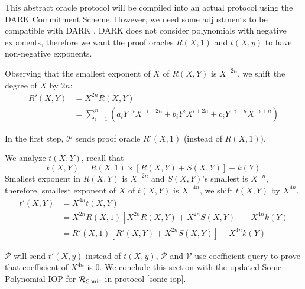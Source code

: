 This abstract oracle protocol will be compiled into an actual protocol using the DARK Commitment Scheme. However, we need some adjustments to be compatible with DARK \cite{bunz2020transparent}. DARK does not consider polynomials with negative exponents, therefore we want the proof oracles $R(X, 1)$ and $t(X, y)$ to have non-negative exponents.

Observing that the smallest exponent of $X$ of $R(X, Y)$ is $X^{-2n}$, we shift the degree of $X$ by $2n$:
\begin{align*}
R'(X, Y)
&= X^{2n} R(X, Y) \\
&= \sum_{i=1}^n \left( a_i Y^{-i} X^{-i + 2n} + b_i Y^{i} X^{i + 2n} + c_i Y^{-i-n} X^{-i+n}  \right)
\end{align*}

In the first step, $\mathcal{P}$ sends proof oracle $R'(X, 1)$ (instead of $R(X, 1)$).

We analyze $t(X, Y)$, recall that
$$t(X, Y) = R(X, 1) \times \left[ R(X, Y) + S(X, Y) \right] - k(Y)$$
Smallest exponent in $R(X, Y)$ is $X^{-2n}$ and $S(X, Y)$'s smallest is $X^{-n}$, therefore, smallest exponent of $X$ of $t(X, Y)$ is $X^{-4n}$, we shift $t(X, Y)$ by $X^{4n}$.
\begin{align*}
t'(X, Y)
&= X^{4n} t(X, Y) \\
&= X^{2n} R(X, 1) \left[ X^{2n} R(X, Y) + X^{2n} S(X, Y) \right] - X^{4n} k(Y) \\
&= R'(X, 1) \left[ R'(X, Y) + X^{2n} S(X, Y) \right] - X^{4n} k(Y)
\end{align*}

$\mathcal{P}$ will send $t'(X, y)$ instead of $t(X, y)$, $\mathcal{P}$ and $\mathcal{V}$ use coefficient query to prove that coefficient of $X^{4n}$ is 0. We conclude this section with the updated Sonic Polynomial IOP for $\mathcal{R}_{\mathrm{Sonic}}$ in  protocol \ref{sonic-iop}.

